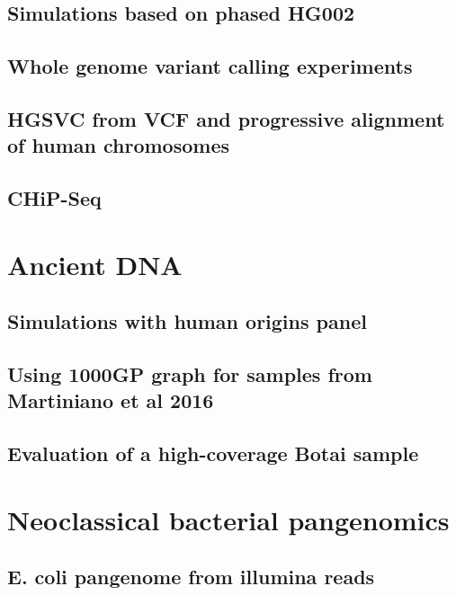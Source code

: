\subsection{Simulations based on phased HG002}

\subsection{Whole genome variant calling experiments}

\subsection{HGSVC from VCF and progressive alignment of human chromosomes}

\subsection{CHiP-Seq}


\section{Ancient DNA}

\subsection{Simulations with human origins panel}

\subsection{Using 1000GP graph for samples from Martiniano et al 2016}

\subsection{Evaluation of a high-coverage Botai sample}


\section{Neoclassical bacterial pangenomics}

\subsection{E. coli pangenome from illumina reads}

